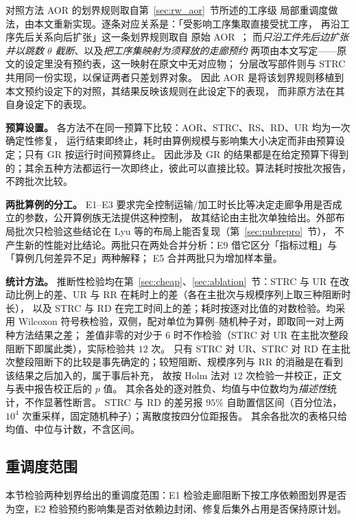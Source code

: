 \documentclass[manuscript,screen,review]{acmart}
\providecommand{\STRC}{\textsc{STRC}}
\begin{document}
对照方法 AOR 的划界规则取自第~\ref{sec:rw_aor}~节所述的工序级
局部重调度做法，由本文重新实现。逐条对应关系是：「受影响工序集取直接受扰工序，
再沿工序先后关系向后扩张」这一条划界规则取自
原始 AOR~\cite{subramaniam2003maor}；
而\emph{只沿工件先后边扩张并以跳数 \(\theta\) 截断}、以及\emph{把工序集映射为须释放的走廊预约}
两项由本文写定——原文的设定里没有预约表，这一映射在原文中无对应物；
分层改写部件则与 \STRC{} 共用同一份实现，以保证两者只差划界对象。
因此 AOR 是将该划界规则移植到本文预约设定下的对照，其结果反映该规则在此设定下的表现，
而非原方法在其自身设定下的表现。

\textbf{预算设置。}
各方法不在同一预算下比较：AOR、\STRC{}、RS、RD、UR 均为一次确定性修复，
运行结束即终止，耗时由算例规模与影响集大小决定而非由预算设定；只有 GR 按运行时间预算终止。
因此涉及 GR 的结果都是在给定预算下得到的；其余五种方法都运行一次即终止，彼此可以直接比较。算法耗时按批次报告，不跨批次比较。

\textbf{两批算例的分工。}
E1--E3 要求完全控制运输/加工时长比等决定走廊争用是否成立的参数，公开算例族无法提供这种控制，
故其结论由主批次单独给出。外部布局批次只检验这些结论在 Lyu 等的布局上能否复现（第~\ref{sec:pubrepro}~节），
不产生新的性能对比结论。两批只在两处合并分析：E9 借它区分「指标过粗」与「算例几何差异不足」两种解释；
E5 合并两批只为增加样本量。

\textbf{统计方法。}
推断性检验均在第~\ref{sec:cheap}、\ref{sec:ablation}~节：\STRC{} 与 UR 在改动比例上的差、UR 与 RR 在耗时上的差（各在主批次与规模序列上取三种阻断时长），
以及 \STRC{} 与 RD 在完工时间上的差；耗时按逐对比值的对数检验。均采用 Wilcoxon 符号秩检验，双侧，配对单位为算例--随机种子对，即取同一对上两种方法结果之差；
差值非零的对少于 \(6\) 时不作检验（\STRC{} 对 UR 在主批次整段阻断下即属此类），实际检验共 \(12\) 次。
只有 \STRC{} 对 UR、\STRC{} 对 RD 在主批次整段阻断下的比较是事先确定的；较短阻断、规模序列与 RR 的消融是在看到该结果之后加入的，属于事后补充，
故按 Holm 法对 \(12\) 次检验一并校正，正文与表中报告校正后的 \(p\) 值。
其余各处的逐对胜负、均值与中位数均为\emph{描述性}统计，不作显著性断言。
\STRC{} 与 RD 的差另报 \(95\%\) 自助置信区间（百分位法，\(10^4\) 次重采样，固定随机种子）；离散度按四分位距报告。
其余各批次的表格只给均值、中位与计数，不含区间。

\subsection{重调度范围}
\label{sec:exp_scope}

本节检验两种划界给出的重调度范围：E1 检验走廊阻断下按工序依赖图划界是否为空，E2 检验预约影响集是否对依赖边封闭、修复后集外占用是否保持原计划。
\end{document}
